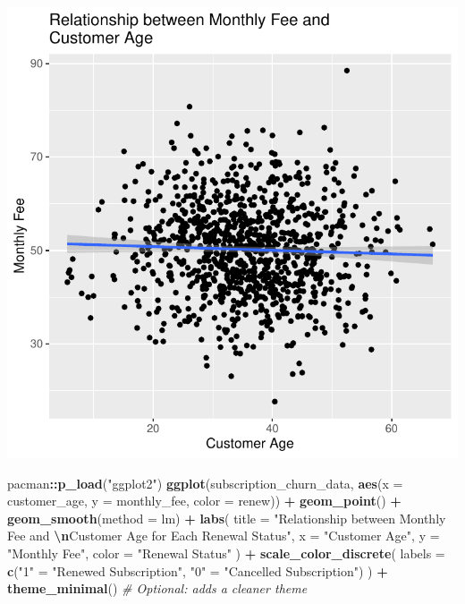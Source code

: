 \documentclass[
]{article}
\newenvironment{Shaded}{\begin{snugshade}}{\end{snugshade}}
\newcommand{\AttributeTok}[1]{\textcolor[rgb]{0.13,0.29,0.53}{#1}}
\newcommand{\CommentTok}[1]{\textcolor[rgb]{0.56,0.35,0.01}{\textit{#1}}}
\newcommand{\FunctionTok}[1]{\textcolor[rgb]{0.13,0.29,0.53}{\textbf{#1}}}
\newcommand{\NormalTok}[1]{#1}
\newcommand{\OtherTok}[1]{\textcolor[rgb]{0.56,0.35,0.01}{#1}}
\newcommand{\SpecialCharTok}[1]{\textcolor[rgb]{0.81,0.36,0.00}{\textbf{#1}}}
\newcommand{\StringTok}[1]{\textcolor[rgb]{0.31,0.60,0.02}{#1}}
\begin{document}
\includegraphics{3_logistic_regression_files/figure-latex/scatter_plot_2-1.pdf}

\begin{Shaded}
\begin{Highlighting}[]
\NormalTok{pacman}\SpecialCharTok{::}\FunctionTok{p\_load}\NormalTok{(}\StringTok{"ggplot2"}\NormalTok{)}
\FunctionTok{ggplot}\NormalTok{(subscription\_churn\_data,}
       \FunctionTok{aes}\NormalTok{(}\AttributeTok{x =}\NormalTok{ customer\_age, }\AttributeTok{y =}\NormalTok{ monthly\_fee, }\AttributeTok{color =}\NormalTok{ renew)) }\SpecialCharTok{+} 
  \FunctionTok{geom\_point}\NormalTok{() }\SpecialCharTok{+}
  \FunctionTok{geom\_smooth}\NormalTok{(}\AttributeTok{method =}\NormalTok{ lm) }\SpecialCharTok{+}
  \FunctionTok{labs}\NormalTok{(}
    \AttributeTok{title =} \StringTok{"Relationship between Monthly Fee and }\SpecialCharTok{\textbackslash{}n}\StringTok{Customer Age for Each Renewal Status"}\NormalTok{,}
    \AttributeTok{x =} \StringTok{"Customer Age"}\NormalTok{,}
    \AttributeTok{y =} \StringTok{"Monthly Fee"}\NormalTok{,}
    \AttributeTok{color =} \StringTok{"Renewal Status"}
\NormalTok{  ) }\SpecialCharTok{+}
  \FunctionTok{scale\_color\_discrete}\NormalTok{(}
    \AttributeTok{labels =} \FunctionTok{c}\NormalTok{(}\StringTok{"1"} \OtherTok{=} \StringTok{"Renewed Subscription"}\NormalTok{, }\StringTok{"0"} \OtherTok{=} \StringTok{"Cancelled Subscription"}\NormalTok{)}
\NormalTok{  ) }\SpecialCharTok{+} 
  \FunctionTok{theme\_minimal}\NormalTok{()  }\CommentTok{\# Optional: adds a cleaner theme}
\end{Highlighting}
\end{Shaded}
\end{document}
